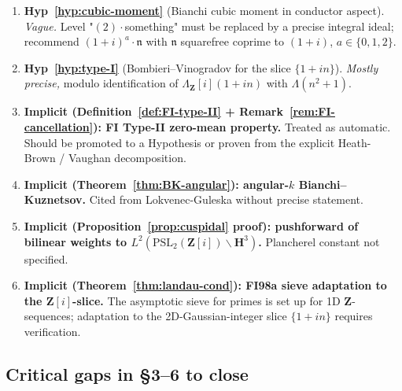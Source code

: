 \documentclass[11pt]{article}
\theoremstyle{definition}
\newcommand{\Z}{\mathbf{Z}}
\newcommand{\HH}{\mathbf{H}}
\newcommand{\Zi}{\Z[i]}
\newcommand{\nn}{\mathfrak{n}}
\begin{document}
\begin{enumerate}
\item \textbf{Hyp~\ref{hyp:cubic-moment}} (Bianchi cubic moment in conductor aspect). \emph{Vague.} Level "$(2)\cdot$something" must be replaced by a precise integral ideal; recommend $(1+i)^a\cdot\nn$ with $\nn$ squarefree coprime to $(1+i)$, $a\in\{0,1,2\}$.
\item \textbf{Hyp~\ref{hyp:type-I}} (Bombieri--Vinogradov for the slice $\{1+in\}$). \emph{Mostly precise,} modulo identification of $\Lambda_\Zi(1+in)$ with $\Lambda(n^2+1)$.
\item \textbf{Implicit (Definition~\ref{def:FI-type-II} + Remark~\ref{rem:FI-cancellation}): FI Type-II zero-mean property.} Treated as automatic. Should be promoted to a Hypothesis or proven from the explicit Heath-Brown / Vaughan decomposition.
\item \textbf{Implicit (Theorem~\ref{thm:BK-angular}): angular-$k$ Bianchi--Kuznetsov.} Cited from Lokvenec-Guleska without precise statement.
\item \textbf{Implicit (Proposition~\ref{prop:cuspidal} proof): pushforward of bilinear weights to $L^2(\mathrm{PSL}_2(\Zi)\backslash\HH^3)$.} Plancherel constant not specified.
\item \textbf{Implicit (Theorem~\ref{thm:landau-cond}): FI98a sieve adaptation to the $\Zi$-slice.} The asymptotic sieve for primes is set up for 1D $\Z$-sequences; adaptation to the 2D-Gaussian-integer slice $\{1+in\}$ requires verification.
\end{enumerate}

\subsection*{Critical gaps in §3--6 to close}
\end{document}
